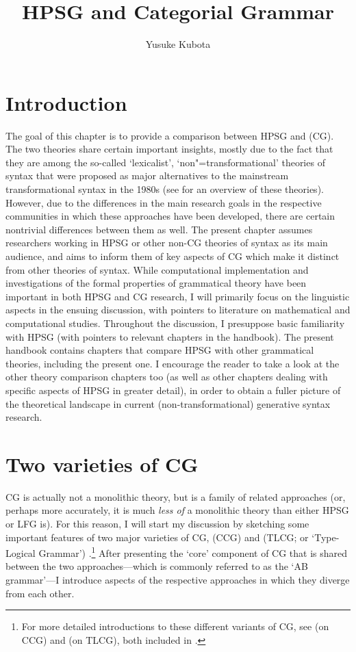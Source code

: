 \documentclass[output=paper]{langsci/langscibook}
\author{Yusuke Kubota\affiliation{University of Tsukuba}}
\title{HPSG and Categorial Grammar}
\begin{document}
\label{chap-cg}


\section{Introduction}

The goal of this chapter is to provide a comparison between HPSG and
 (CG). The two theories share certain important
insights, mostly due to the fact that they are among the so-called
`lexicalist', `non"=transformational' theories of syntax that were
proposed as major alternatives to the mainstream transformational
syntax in the 1980s (see \citet{BB2011a} for an overview of these
theories). However, due to the differences in the main research goals
in the respective communities in which these approaches have been
developed, there are certain nontrivial differences between them as
well. The present chapter assumes researchers working in HPSG or other
non-CG theories of syntax as its main audience, and aims to inform
them of key aspects of CG which make it distinct from other theories
of syntax. While computational implementation and investigations of the
formal properties of grammatical theory have been important in both
HPSG and CG research, I will primarily focus on the linguistic aspects
in the ensuing discussion, with pointers to literature on mathematical
and computational studies. Throughout the discussion, I presuppose
basic familiarity with HPSG (with pointers to relevant chapters in the
handbook). The present handbook contains chapters that compare HPSG
with other grammatical theories, including the present one. I
encourage the reader to take a look at the other theory comparison
chapters too (as well as other chapters dealing with specific
aspects of HPSG in greater detail), in order to obtain a fuller picture of the
theoretical landscape in current (non-transformational) generative
syntax research.


\section{Two varieties of CG }

CG is actually not a monolithic theory, but is a family of related
approaches (or, perhaps more accurately, it is much \emph{less of} a
monolithic theory than either HPSG or LFG is). For this reason, I will
start my discussion by sketching some important features of two major
varieties of CG,  (CCG)
\citep{Steedman2000a-u,steedman2012} and 
(TLCG; or `Type-Logical Grammar')
\citep{Morrill94a-u,Moortgat2011a-u}.\footnote{For 
more detailed introductions to these different variants of CG, see 
\citet{steedman2011ccg} (on CCG) and \citet{oehrle2011} (on 
TLCG), both included in \citet{BB2011a}.} After presenting the `core'
component of CG that is shared between the two approaches---which is
commonly referred to as the `AB grammar'---I introduce
aspects of the respective approaches in which they diverge from each
other.
\end{document}
